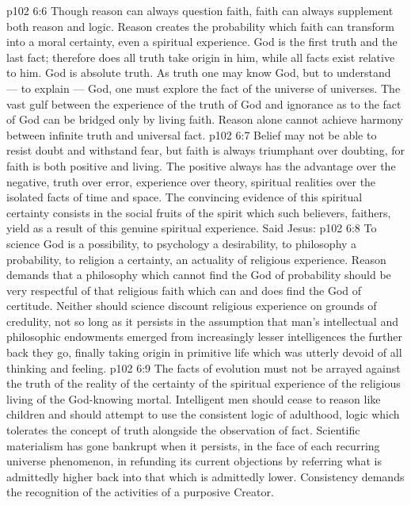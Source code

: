 \vs p102 6:6 \pc Though reason can always question faith, faith can always supplement both reason and logic. Reason creates the probability which faith can transform into a moral certainty, even a spiritual experience. God is the first truth and the last fact; therefore does all truth take origin in him, while all facts exist relative to him. God is absolute truth. As truth one may know God, but to understand --- to explain --- God, one must explore the fact of the universe of universes. The vast gulf between the experience of the truth of God and ignorance as to the fact of God can be bridged only by living faith. Reason alone cannot achieve harmony between infinite truth and universal fact.
\vs p102 6:7 Belief may not be able to resist doubt and withstand fear, but faith is always triumphant over doubting, for faith is both positive and living. The positive always has the advantage over the negative, truth over error, experience over theory, spiritual realities over the isolated facts of time and space. The convincing evidence of this spiritual certainty consists in the social fruits of the spirit which such believers, faithers, yield as a result of this genuine spiritual experience. Said Jesus: 
\vs p102 6:8 \pc To science God is a possibility, to psychology a desirability, to philosophy a probability, to religion a certainty, an actuality of religious experience. Reason demands that a philosophy which cannot find the God of probability should be very respectful of that religious faith which can and does find the God of certitude. Neither should science discount religious experience on grounds of credulity, not so long as it persists in the assumption that man’s intellectual and philosophic endowments emerged from increasingly lesser intelligences the further back they go, finally taking origin in primitive life which was utterly devoid of all thinking and feeling.
\vs p102 6:9 The facts of evolution must not be arrayed against the truth of the reality of the certainty of the spiritual experience of the religious living of the God\hyp{}knowing mortal. Intelligent men should cease to reason like children and should attempt to use the consistent logic of adulthood, logic which tolerates the concept of truth alongside the observation of fact. Scientific materialism has gone bankrupt when it persists, in the face of each recurring universe phenomenon, in refunding its current objections by referring what is admittedly higher back into that which is admittedly lower. Consistency demands the recognition of the activities of a purposive Creator.
